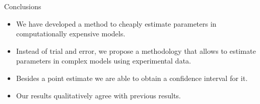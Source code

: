 \documentclass[11pt]{beamer}
\theoremstyle{plain}
\theoremstyle{definition}
\begin{document}
\begin{frame}{Conclusions}
\begin{itemize}
\item We have developed a method to cheaply estimate parameters in computationally expensive models.
\item Instead of trial and error, we propose a methodology that allows to estimate
parameters in complex models using experimental data.
\item Besides a point estimate we are able to obtain a confidence interval for it.
\item Our results qualitatively agree with previous results.
\end{itemize}


\end{frame}
\end{document}
